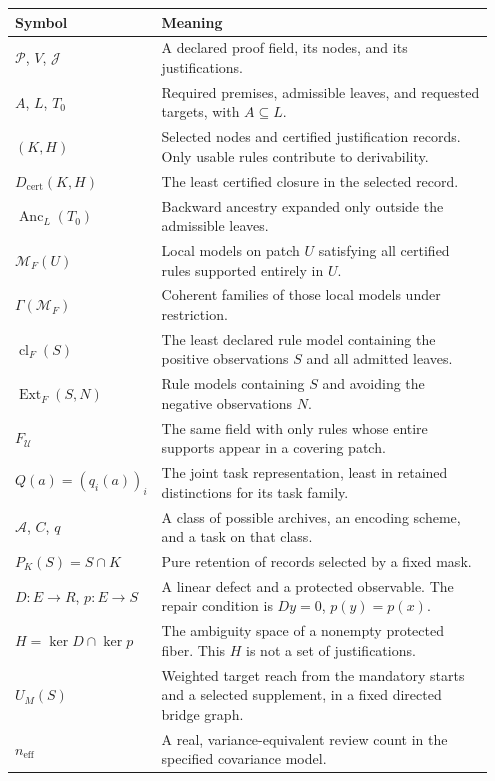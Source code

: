 \documentclass[11pt,oneside]{article}
\theoremstyle{komorebiplain}
\theoremstyle{komorebidefinition}
\theoremstyle{komorebiremark}
\newcommand{\Pcal}{\mathcal P}
\newcommand{\Jcal}{\mathcal J}
\newcommand{\Anc}{\operatorname{Anc}}
\begin{document}
\begingroup\small
\begin{longtable}{@{}L{0.24\linewidth}L{0.71\linewidth}@{}}
\toprule
Symbol & Meaning \\
\midrule
\endhead
$\Pcal$, $V$, $\Jcal$ & A declared proof field, its nodes, and its justifications. \\
$A$, $L$, $T_0$ & Required premises, admissible leaves, and requested targets, with $A\subseteq L$. \\
$(K,H)$ & Selected nodes and certified justification records. Only usable rules contribute to derivability. \\
$D_{\mathrm{cert}}(K,H)$ & The least certified closure in the selected record. \\
$\Anc_L(T_0)$ & Backward ancestry expanded only outside the admissible leaves. \\
$\mathcal M_F(U)$ & Local models on patch $U$ satisfying all certified rules supported entirely in $U$. \\
$\Gamma(\mathcal M_F)$ & Coherent families of those local models under restriction. \\
$\operatorname{cl}_F(S)$ & The least declared rule model containing the positive observations $S$ and all admitted leaves. \\
$\operatorname{Ext}_F(S,N)$ & Rule models containing $S$ and avoiding the negative observations $N$. \\
$F_{\mathcal U}$ & The same field with only rules whose entire supports appear in a covering patch. \\
$Q(a)=(q_i(a))_i$ & The joint task representation, least in retained distinctions for its task family. \\
$\mathscr A$, $C$, $q$ & A class of possible archives, an encoding scheme, and a task on that class. \\
$P_K(S)=S\cap K$ & Pure retention of records selected by a fixed mask. \\
$D:E\to R$, $p:E\to S$ & A linear defect and a protected observable. The repair condition is $Dy=0$, $p(y)=p(x)$. \\
$H=\ker D\cap\ker p$ & The ambiguity space of a nonempty protected fiber. This $H$ is not a set of justifications. \\
$U_M(S)$ & Weighted target reach from the mandatory starts and a selected supplement, in a fixed directed bridge graph. \\
$n_{\mathrm{eff}}$ & A real, variance-equivalent review count in the specified covariance model. \\
\bottomrule
\end{longtable}
\endgroup
\end{document}
